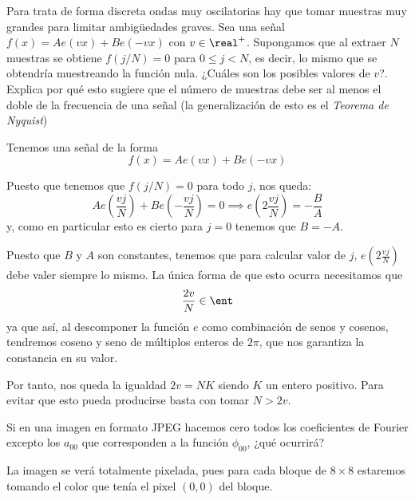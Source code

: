 \begin{problem}[5]
Para trata de forma discreta ondas muy oscilatorias hay que tomar muestras muy grandes para limitar ambigüedades graves. Sea una señal $f(x)=Ae(vx)+Be(-vx)$ con $v \in \real^+$. Supongamos que al extraer $N$ muestras se obtiene $f(j/N)=0$ para $0 \leq j < N$, es decir, lo mismo que se obtendría muestreando la función nula. ¿Cuáles son los posibles valores de $v$?. Explica por qué esto sugiere que el número de muestras debe ser al menos el doble de la frecuencia de una señal (la generalización de esto es el \textit{Teorema de Nyquist})
\solution

Tenemos una señal de la forma
\[f(x)=Ae(vx)+Be(-vx)\]

Puesto que tenemos que $f(j/N)=0$ para todo $j$, nos queda:
\[Ae\left(\frac{vj}{N}\right)+Be\left(-\frac{vj}{N}\right)=0 \implies e\left(2\frac{vj}{N}\right)=-\frac{B}{A}\]
y, como en particular esto es cierto para $j=0$ tenemos que $B=-A$.

Puesto que $B$ y $A$ son constantes, tenemos que para calcular valor de $j$, $e\left(2\frac{vj}{N}\right)$ debe valer siempre lo mismo. La única forma de que esto ocurra necesitamos que
\[\frac{2v}{N}\in \ent\]
ya que así, al descomponer la función $e$ como combinación de senos y cosenos, tendremos coseno y seno de múltiplos enteros de $2π$, que nos garantiza la constancia en su valor.

Por tanto, nos queda la igualdad $2v=NK$ siendo $K$ un entero positivo. Para evitar que esto pueda producirse basta con tomar $N>2v$.
\end{problem}

\begin{problem}[6]
Si en una imagen en formato JPEG hacemos cero todos los coeficientes de Fourier excepto los $a_{00}$ que corresponden a la función $\phi_{00}$, ¿qué ocurrirá?
\solution

La imagen se verá totalmente pixelada, pues para cada bloque de $8\times 8$ estaremos tomando el color que tenía el pixel $(0,0)$ del bloque.

\end{problem}

